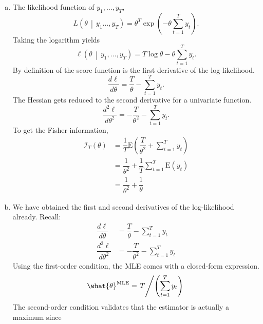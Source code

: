 \documentclass[answers]{exam}
\begin{document}
\begin{questions}
\begin{solution}
    \begin{enumerate}[a)]
      \item The likelihood function of $y_{1},\ldots,y_{T}$,
      \begin{equation}
        L\left(\theta\,\middle|\,y_{1}\ldots,y_{T}\right) = \theta^{T}\exp\left(-\theta\sum_{t=1}^{T}y_{t}\right).
      \end{equation}
      Taking the logarithm yields
      \begin{equation}
        \ell\left(\theta\,\middle|\,y_{1},\ldots,y_{T}\right) = T\log\theta-\theta\sum_{t=1}^{T}y_{t}.
      \end{equation}
      By definition of the score function is the first derivative of the log-likelihood.
      \begin{equation}
        \dfrac{d\ell}{d\theta} = \dfrac{T}{\theta}-\sum_{t=1}^{T}y_{t}.
      \end{equation}
      The Hessian gets reduced to the second derivative for a univariate function.
      \begin{equation}
        \dfrac{d^{2}\ell}{d\theta^{2}} = -\dfrac{T}{\theta^{2}}-\sum_{t=1}^{T}y_{t}.
      \end{equation}
      To get the Fisher information,
      \begin{align}
        \mathcal{I}_{T}\left(\theta\right) &= \dfrac{1}{T}\mathrm{E}\left(\dfrac{T}{\theta^{2}}+\sum_{t=1}^{T}y_{t}\right)\\
        &= \dfrac{1}{\theta^{2}}+\dfrac{1}{T}\sum_{t=1}^{T}\mathrm{E}\left(y_{t}\right)\\
        &= \dfrac{1}{\theta^{2}}+\dfrac{1}{\theta}
      \end{align}
      \item We have obtained the first and second derivatives of the log-likelihood already. Recall:
      \begin{align}
        \dfrac{d\ell}{d\theta} &= \dfrac{T}{\theta}-\sum_{t=1}^{T}y_{t}\\
        \dfrac{d^{2}\ell}{d\theta^{2}} &= -\dfrac{T}{\theta^{2}}-\sum_{t=1}^{T}y_{t}
      \end{align}
      Using the first-order condition, the MLE comes with a closed-form expression.
      \begin{equation}
        \what{\theta}^{\text{MLE}} = \left.T\middle/\left(\sum_{t=1}^{T}y_{t}\right)\right.
      \end{equation}
      The second-order condition validates that the estimator is actually a maximum since
      \begin{equation}

\end{equation}
\end{enumerate}
\end{solution}
\end{questions}
\end{document}
